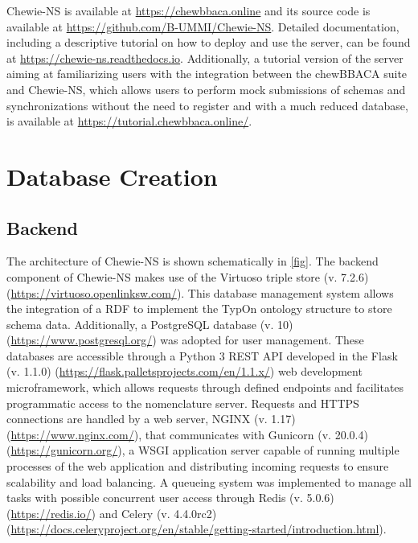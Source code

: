 \ac{Chewie-NS} is available at \url{https://chewbbaca.online} and its source code is available at \url{https://github.com/B-UMMI/Chewie-NS}. Detailed documentation, including a descriptive tutorial on how to deploy and use the server, can be found at \url{https://chewie-ns.readthedocs.io}. Additionally, a tutorial version of the server aiming at familiarizing users with the integration between the chewBBACA suite and \ac{Chewie-NS}, which allows users to perform mock submissions of schemas and synchronizations without the need to register and with a much reduced database, is available at \url{https://tutorial.chewbbaca.online/}.

\section{Database Creation} \label{sec:ch3_database_creation}

\subsection{Backend} \label{ssec:ch3_database_creation_backend}

The architecture of \ac{Chewie-NS} is shown schematically in \ref{fig}. The backend component of \ac{Chewie-NS} makes use of the Virtuoso triple store (v. 7.2.6) (\url{https://virtuoso.openlinksw.com/}). This database management system allows the integration of a \ac{RDF} to implement the TypOn ontology \cite{vaz_typon_2014} structure to store schema data. Additionally, a PostgreSQL database (v. 10) (\url{https://www.postgresql.org/}) was adopted for user management. These databases are accessible through a Python 3 \ac{REST} \ac{API} developed in the Flask (v. 1.1.0) (\url{https://flask.palletsprojects.com/en/1.1.x/}) web development microframework, which allows requests through defined endpoints and facilitates programmatic access to the nomenclature server. Requests and \ac{HTTPS} connections are handled by a web server, NGINX (v. 1.17) (\url{https://www.nginx.com/}), that communicates with Gunicorn (v. 20.0.4) (\url{https://gunicorn.org/}), a \ac{WSGI} application server capable of running multiple processes of the web application and distributing incoming requests to ensure scalability and load balancing. A queueing system was implemented to manage all tasks with possible concurrent user access through Redis (v. 5.0.6) (\url{https://redis.io/}) and Celery (v. 4.4.0rc2) (\url{https://docs.celeryproject.org/en/stable/getting-started/introduction.html}).


